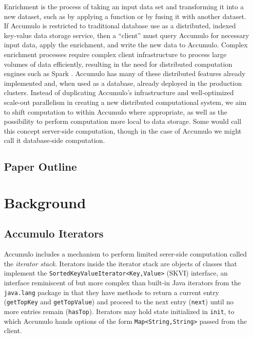 Enrichment \cite{x} is the process of taking an input data set and transforming it into a new dataset, such as by 
applying a function or by fusing it with another dataset.
If Accumulo is restricted to traditional database use as a distributed, indexed key-value data storage service,
then a ``client'' must query Accumulo for necessary input data, apply the enrichment, and write the new data 
to Accumulo.  
Complex enrichment processes require complex client infrastructure to process large volumes of data efficiently,
resulting in the need for distributed computation engines such as Spark \cite{x}.
Accumulo has many of these distributed features already implemented and, when used as a database, 
already deployed in the production clusters. 
Instead of duplicating Accumulo's infrastructure and well-optimized scale-out parallelism
in creating a new distributed computational system, we aim to shift computation 
to within Accumulo where appropriate,
as well as the possibility to perform computation more local to data storage.
Some would call this concept server-side computation, though in the case of Accumulo we might call it 
database-side computation.



\subsection{Paper Outline}



\section{Background}
\label{sBackground}







\subsection{Accumulo Iterators}
Accumulo includes a mechanism to perform limited serer-side computation called the 
\emph{iterator stack}.  Iterators inside the iterator stack are objects of classes
that implement the \texttt{SortedKeyValueIterator<Key,Value>} (SKVI) interface, an interface
reminiscent of but more complex than built-in Java iterators from the \texttt{java.lang} package
in that they have methods to return a current entry (\texttt{getTopKey} and \texttt{getTopValue})
and proceed to the next entry (\texttt{next}) until no more entries remain (\texttt{hasTop}).
Iterators may hold state initialized in \texttt{init}, to which Accumulo hands 
options of the form \texttt{Map<String,String>} passed from the client.%

